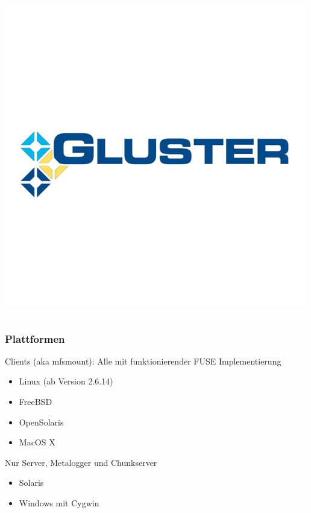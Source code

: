 \documentclass{beamer}
\begin{document}
\begin{frame}
\begin{columns}
	\includegraphics[scale=0.2]{gluster.jpg}
	\end{columns}
\end{frame}

\begin{frame}
	\frametitle{Plattformen}
	\begin{block}{Clients (aka mfsmount): Alle mit funktionierender FUSE Implementierung}
	\begin{itemize}
		\item Linux (ab Version 2.6.14)
		\item FreeBSD
		\item OpenSolaris
		\item MacOS X
	\end{itemize}
	\end{block}
	\begin{block}{Nur Server, Metalogger und Chunkserver}
	\begin{itemize}
		\item Solaris 
		\item Windows mit Cygwin
	\end{itemize}
	\end{block}
\end{frame}
\end{document}
